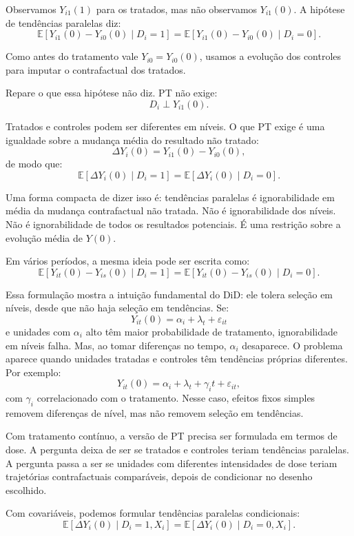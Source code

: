 \documentclass[
]{article}
\begin{document}
Observamos \(Y_{i1}(1)\) para os tratados, mas não observamos \(Y_{i1}(0)\). A hipótese de tendências paralelas diz:
\[
\mathbb{E}[Y_{i1}(0)-Y_{i0}(0)\mid D_i=1]
=
\mathbb{E}[Y_{i1}(0)-Y_{i0}(0)\mid D_i=0].
\]

Como antes do tratamento vale \(Y_{i0}=Y_{i0}(0)\), usamos a evolução dos controles para imputar o contrafactual dos tratados.

Repare o que essa hipótese não diz. PT não exige:
\[
D_i \perp Y_{i1}(0).
\]

Tratados e controles podem ser diferentes em níveis. O que PT exige é uma igualdade sobre a mudança média do resultado não tratado:
\[
\Delta Y_i(0)=Y_{i1}(0)-Y_{i0}(0),
\]
de modo que:
\[
\mathbb{E}[\Delta Y_i(0)\mid D_i=1]
=
\mathbb{E}[\Delta Y_i(0)\mid D_i=0].
\]

Uma forma compacta de dizer isso é: tendências paralelas é ignorabilidade em média da mudança contrafactual não tratada. Não é ignorabilidade dos níveis. Não é ignorabilidade de todos os resultados potenciais. É uma restrição sobre a evolução média de \(Y(0)\).

Em vários períodos, a mesma ideia pode ser escrita como:
\[
\mathbb{E}[Y_{it}(0) - Y_{is}(0) \mid D_i = 1]
=
\mathbb{E}[Y_{it}(0) - Y_{is}(0) \mid D_i = 0].
\]

Essa formulação mostra a intuição fundamental do DiD: ele tolera seleção em níveis, desde que não haja seleção em tendências. Se:
\[
Y_{it}(0)=\alpha_i+\lambda_t+\varepsilon_{it}
\]
e unidades com \(\alpha_i\) alto têm maior probabilidade de tratamento, ignorabilidade em níveis falha. Mas, ao tomar diferenças no tempo, \(\alpha_i\) desaparece. O problema aparece quando unidades tratadas e controles têm tendências próprias diferentes. Por exemplo:
\[
Y_{it}(0)=\alpha_i+\lambda_t+\gamma_i t+\varepsilon_{it},
\]
com \(\gamma_i\) correlacionado com o tratamento. Nesse caso, efeitos fixos simples removem diferenças de nível, mas não removem seleção em tendências.

Com tratamento contínuo, a versão de PT precisa ser formulada em termos de dose. A pergunta deixa de ser se tratados e controles teriam tendências paralelas. A pergunta passa a ser se unidades com diferentes intensidades de dose teriam trajetórias contrafactuais comparáveis, depois de condicionar no desenho escolhido.

Com covariáveis, podemos formular tendências paralelas condicionais:
\[
\mathbb{E}[\Delta Y_i(0)\mid D_i=1,X_i]
=
\mathbb{E}[\Delta Y_i(0)\mid D_i=0,X_i].
\]
\end{document}
